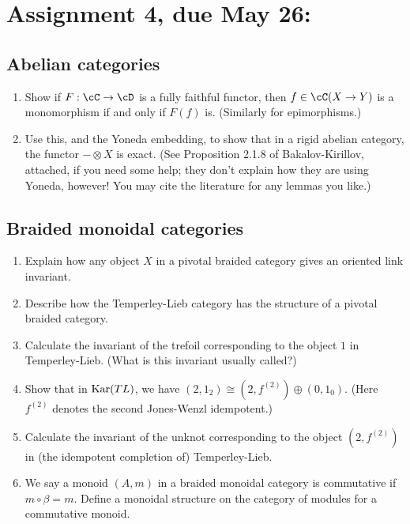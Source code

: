 \documentclass[12pt]{amsart}
\begin{document}
\newpage
\section{Assignment 4, due May 26:}
\subsection{Abelian categories}
\begin{enumerate}
\item Show if $F:\cC\to\cD$ is a fully faithful functor, then $f \in \cC(X \to Y)$ is a monomorphism if and only if $F(f)$ is. (Similarly for epimorphisms.)
\item Use this, and the Yoneda embedding, to show that in a rigid abelian category, the functor $- \otimes X$ is exact. (See Proposition 2.1.8 of Bakalov-Kirillov, attached, if you need some help; they don't explain how they are using Yoneda, however! You may cite the literature for any lemmas you like.)
\end{enumerate}

\subsection{Braided monoidal categories}
\begin{enumerate}
\item Explain how any object $X$ in a pivotal braided category gives an oriented link invariant.
\item Describe how the Temperley-Lieb category has the structure of a pivotal braided category.
\item Calculate the invariant of the trefoil corresponding to the object $1$ in Temperley-Lieb. (What is this invariant usually called?)
\item Show that in $\operatorname{Kar}(TL)$, we have $(2,1_2) \cong (2,f^{(2)}) \oplus (0, 1_0)$. (Here $f^{(2)}$ denotes the second Jones-Wenzl idempotent.)
\item Calculate the invariant of the unknot corresponding to the object $(2,f^{(2)})$ in (the idempotent completion of) Temperley-Lieb.
\item We say a monoid $(A, m)$ in a braided monoidal category is commutative if $m \circ \beta = m$. Define a monoidal structure on the category of modules for a commutative monoid.
\end{enumerate}


\end{document}
